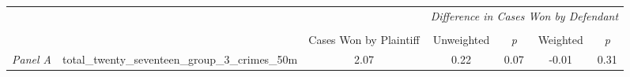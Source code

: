 \begin{tabular}{llccccc}
\toprule
 &  & \textit{} & \multicolumn{4}{c}{\textit{Difference in Cases Won by Defendant}} \\
\cline{4-7}
\\
 &  & Cases Won by Plaintiff & Unweighted & \emph{p} & Weighted & \emph{p} \\
\midrule
\textit{Panel A} & total_twenty_seventeen_group_3_crimes_50m & 2.07 & 0.22 & 0.07 & -0.01 & 0.31 \\
\cline{1-7}
\bottomrule
\end{tabular}
